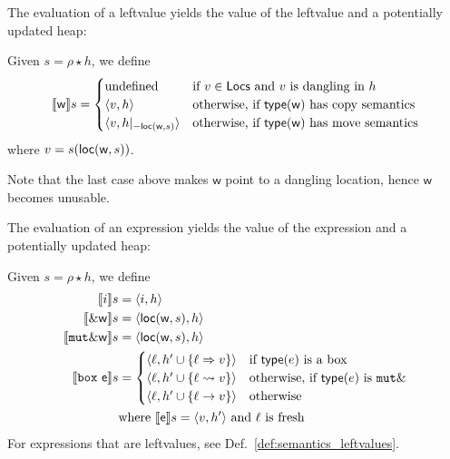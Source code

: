 The evaluation of a leftvalue yields the value of the leftvalue and a potentially updated heap:

\begin{definition}\label{def:semantics_leftvalues}
  Given $s=\rho\star h$, we define
  \[
  \den[\mathsf{w}]{s}=\begin{cases}
  \text{undefined} & \text{if $v\in\Locs$ and $v$ is dangling in $h$}\\
  \langle v, h\rangle & \text{otherwise, if $\type(\mathsf{w})$ has copy semantics}\\
  \langle v, h|_{-\loc(\mathsf{w},s)}\rangle & \text{otherwise, if $\type(\mathsf{w})$ has move semantics}
  \end{cases}
  \]
  where $v=s(\loc(\mathsf{w},s))$.
\end{definition}

\noindent
Note that the last case above makes $\mathsf{w}$ point to a dangling location, hence
$\mathsf{w}$ becomes unusable.

The evaluation of an expression yields the value of the expression and a potentially updated heap:

\begin{definition}\label{def:semantics_expressions}
  Given $s=\rho\star h$, we define
  \begin{align*}
    \den[i]{s}&=\langle i,h\rangle\\
    \den[\borrow\mathsf{w}]{s}&=\langle\loc(\mathsf{w},s),h\rangle\\
    \den[\mathtt{mut}\borrow\mathsf{w}]{s}&=\langle\loc(\mathsf{w},s),h\rangle\\
    \den[\mathtt{box}\ \mathsf{e}]{s}&=
    \begin{cases}
      \langle\ell,h'\cup\{\ell\Rightarrow v\}\rangle & \text{if $\type(e)$ is a box}\\
      \langle\ell,h'\cup\{\ell\leadsto v\}\rangle & \text{otherwise, if $\type(e)$ is $\mathtt{mut}\borrow$}\\
      \langle\ell,h'\cup\{\ell\to v\}\rangle & \text{otherwise}
    \end{cases}\\
    & \text{where $\den[\mathsf{e}]{s}=\langle v, h'\rangle$ and $\ell$ is fresh}
  \end{align*}
  For expressions that are leftvalues, see Def.~\ref{def:semantics_leftvalues}.
\end{definition}

